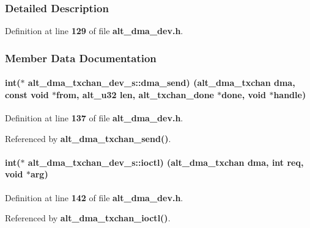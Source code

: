 \subsubsection{Detailed Description}


Definition at line {\bf 129} of file {\bf alt\+\_\+dma\+\_\+dev.\+h}.



\subsubsection{Member Data Documentation}
\paragraph[{dma\+\_\+send}]{\setlength{\rightskip}{0pt plus 5cm}int($\ast$ alt\+\_\+dma\+\_\+txchan\+\_\+dev\+\_\+s\+::dma\+\_\+send) ({\bf alt\+\_\+dma\+\_\+txchan} dma, const void $\ast$from, {\bf alt\+\_\+u32} len, {\bf alt\+\_\+txchan\+\_\+done} $\ast$done, void $\ast$handle)}\label{structalt__dma__txchan__dev__s_a9ead79689c8b21c3132c960e13464695}


Definition at line {\bf 137} of file {\bf alt\+\_\+dma\+\_\+dev.\+h}.



Referenced by {\bf alt\+\_\+dma\+\_\+txchan\+\_\+send()}.

\paragraph[{ioctl}]{\setlength{\rightskip}{0pt plus 5cm}int($\ast$ alt\+\_\+dma\+\_\+txchan\+\_\+dev\+\_\+s\+::ioctl) ({\bf alt\+\_\+dma\+\_\+txchan} dma, int req, void $\ast$arg)}\label{structalt__dma__txchan__dev__s_aa834aa9bd2581456ee8032688f70e1f8}


Definition at line {\bf 142} of file {\bf alt\+\_\+dma\+\_\+dev.\+h}.



Referenced by {\bf alt\+\_\+dma\+\_\+txchan\+\_\+ioctl()}.

